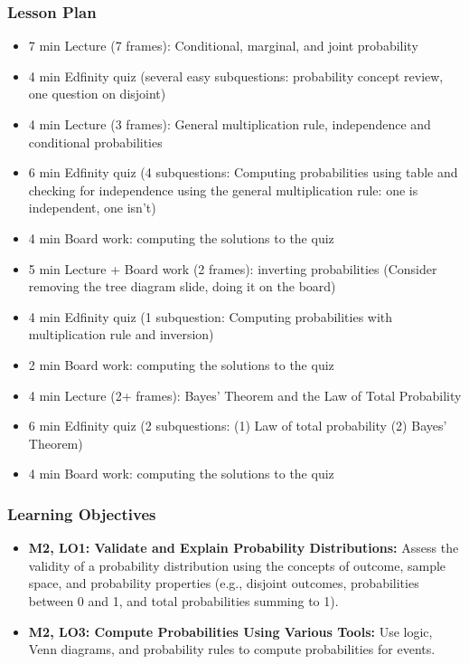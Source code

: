\begin{frame}
    \frametitle{Lesson Plan}
    \begin{itemize}
        \item 7 min Lecture (7 frames): Conditional, marginal, and joint probability
        \item 4 min Edfinity quiz (several easy subquestions: probability concept review, one question on disjoint)
        \item 4 min Lecture (3 frames): General multiplication rule, independence and conditional probabilities
        \item 6 min Edfinity quiz (4 subquestions: Computing probabilities using table and checking for independence using the general multiplication rule: one is independent, one isn't)
        \item 4 min Board work: computing the solutions to the quiz
        \item 5 min Lecture + Board work (2 frames): inverting probabilities (Consider removing the tree diagram slide, doing it on the board)
        \item 4 min Edfinity quiz (1 subquestion: Computing probabilities with multiplication rule and inversion)
        \item 2 min Board work: computing the solutions to the quiz
        \item 4 min Lecture (2+ frames): Bayes' Theorem and the Law of Total Probability
        \item 6 min Edfinity quiz (2 subquestions: (1) Law of total probability (2) Bayes' Theorem)
        \item 4 min Board work: computing the solutions to the quiz
    \end{itemize}
\end{frame}

\begin{frame}
    \frametitle{Learning Objectives}
    \begin{itemize}
        \item \textbf{M2, LO1: Validate and Explain Probability Distributions:} Assess the validity of a probability distribution using the concepts of outcome, sample space, and probability properties (e.g., disjoint outcomes, probabilities between 0 and 1, and total probabilities summing to 1).
        \item \textbf{M2, LO3: Compute Probabilities Using Various Tools:} Use logic, Venn diagrams, and probability rules to compute probabilities for events.
    \end{itemize}
\end{frame}

